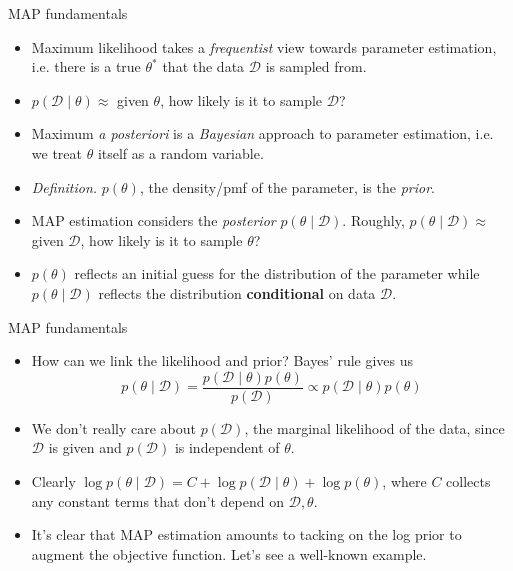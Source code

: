 \documentclass{beamer}
\numberwithin{equation}{section}
\begin{document}
\begin{frame}{MAP fundamentals}
    \begin{itemize}
        \item
        Maximum likelihood takes a \textit{frequentist} view towards parameter
        estimation, i.e. there is a true $ \theta^* $ that the data
        $ \mathcal{D} $ is sampled from.

        \item
        $ p(\mathcal{D} \mid \theta) \approx $ given $ \theta $, how likely is
        it to sample $ \mathcal{D} $?

        \item
        Maximum \textit{a posteriori} is a \textit{Bayesian} approach to
        parameter estimation, i.e. we treat $ \theta $ itself as a random
        variable.

        \item
        \textit{Definition.} $ p(\theta) $, the density/pmf of the parameter,
        is the \textit{prior}.

        \item
        MAP estimation considers the \textit{posterior}
        $ p(\theta \mid \mathcal{D}) $. Roughly, $ p(\theta \mid \mathcal{D}) 
        \approx $ given $ \mathcal{D} $, how likely is it to sample $ \theta $?

        \item
        $ p(\theta) $ reflects an initial guess for the distribution of the
        parameter while $ p(\theta \mid \mathcal{D}) $ reflects the
        distribution \textbf{conditional} on data $ \mathcal{D} $.
    \end{itemize}
\end{frame}

\begin{frame}{MAP fundamentals}
    \begin{itemize}
        \item
        How can we link the likelihood and prior? Bayes' rule gives us
        \begin{equation*}
            p(\theta \mid \mathcal{D}) =
            \frac{p(\mathcal{D} \mid \theta)p(\theta)}{p(\mathcal{D})} \propto
            p(\mathcal{D} \mid \theta)p(\theta)
        \end{equation*}

        \item
        We don't really care about $ p(\mathcal{D}) $, the marginal likelihood
        of the data, since $ \mathcal{D} $ is given and $ p(\mathcal{D}) $ is
        independent of $ \theta $.

        \item
        Clearly $ \log p(\theta \mid \mathcal{D}) = C +
        \log p(\mathcal{D} \mid \theta) + \log p(\theta) $, where $ C $
        collects any constant terms that don't depend on
        $ \mathcal{D}, \theta $.

        \item
        It's clear that MAP estimation amounts to tacking on the log prior to
        augment the objective function. Let's see a well-known example.
    \end{itemize}
\end{frame}
\end{document}
